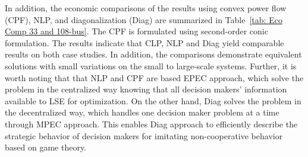 \documentclass[journal]{IEEEtran}
\begin{document}
In addition, the economic comparisons of the results using convex power flow (CPF), NLP, and diagonalization (Diag) are summarized in Table~\mbox{\ref{tab: Eco Comp 33 and 108-bus}}. The CPF is formulated using second-order conic formulation\mbox{\cite{kocuk2017new}}. The results indicate that CLP, NLP and Diag yield comparable results on both case studies. In addition, the comparisons demonstrate equivalent solutions with small variations on the small to large-scale systems. Further, it is worth noting that that NLP and CPF are based EPEC approach, which solve the problem in the centralized way knowing that all decision makers' information available to LSE for optimization. On the other hand, Diag solves the problem in the decentralized way, which handles one decision maker problem at a time through MPEC approach. This enables Diag approach to efficiently describe the strategic behavior of decision makers for imitating non-cooperative behavior based on game theory. 
\end{document}
